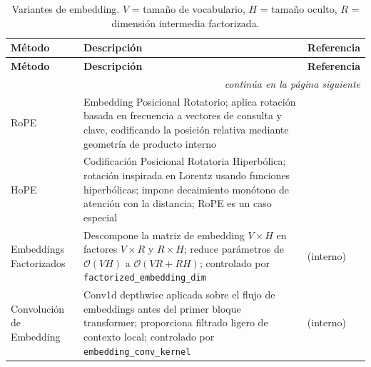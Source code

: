 \small
\begin{longtable}{p{3.0cm}p{7.5cm}p{3.5cm}}
\toprule
\textbf{Método} & \textbf{Descripción} & \textbf{Referencia} \\
\midrule
\endfirsthead
\toprule
\textbf{Método} & \textbf{Descripción} & \textbf{Referencia} \\
\midrule
\endhead
\midrule
\multicolumn{3}{r}{\textit{continúa en la página siguiente}} \\
\endfoot
\bottomrule
\caption{Variantes de embedding. $V$ = tamaño de vocabulario, $H$ = tamaño oculto, $R$ = dimensión intermedia factorizada.}
\label{tab:all-embeddings}
\endlastfoot
RoPE & Embedding Posicional Rotatorio; aplica rotación basada en frecuencia a vectores de consulta y clave, codificando la posición relativa mediante geometría de producto interno & \citep{su_rope_2024} \\
HoPE & Codificación Posicional Rotatoria Hiperbólica; rotación inspirada en Lorentz usando funciones hiperbólicas; impone decaimiento monótono de atención con la distancia; RoPE es un caso especial & \citep{dai_hope_2025} \\
Embeddings Factorizados & Descompone la matriz de embedding $V \times H$ en factores $V \times R$ y $R \times H$; reduce parámetros de $\mathcal{O}(VH)$ a $\mathcal{O}(V R + R H)$; controlado por \texttt{factorized\_embedding\_dim} & (interno) \\
Convolución de Embedding & Conv1d depthwise aplicada sobre el flujo de embeddings antes del primer bloque transformer; proporciona filtrado ligero de contexto local; controlado por \texttt{embedding\_conv\_kernel} & (interno) \\
\bottomrule
\end{longtable}
\normalsize
